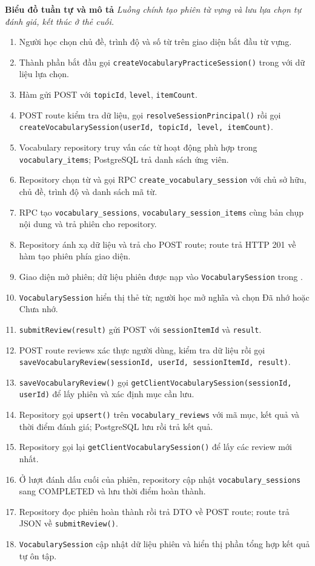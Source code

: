 \documentclass[12pt,a4paper,oneside]{report}
\begin{document}
\noindent\textbf{Biểu đồ tuần tự và mô tả}
\noindent\textit{Luồng chính tạo phiên từ vựng và lưu lựa chọn tự đánh giá, kết thúc ở thẻ cuối.}
\begin{enumerate}
    \item Người học chọn chủ đề, trình độ và số từ trên giao diện bắt đầu từ vựng.
    \item Thành phần bắt đầu gọi \texttt{createVocabularyPracticeSession()} trong  với dữ liệu lựa chọn.
    \item Hàm gửi POST  với \texttt{topicId}, \texttt{level}, \texttt{itemCount}.
    \item POST route kiểm tra dữ liệu, gọi \texttt{resolveSessionPrincipal()} rồi gọi \texttt{createVocabularySession(userId, topicId, level, itemCount)}.
    \item Vocabulary repository truy vấn các từ hoạt động phù hợp trong \texttt{vocabulary\_items}; PostgreSQL trả danh sách ứng viên.
    \item Repository chọn từ và gọi RPC \texttt{create\_vocabulary\_session} với chủ sở hữu, chủ đề, trình độ và danh sách mã từ.
    \item RPC tạo \texttt{vocabulary\_sessions}, \texttt{vocabulary\_session\_items} cùng bản chụp nội dung và trả phiên cho repository.
    \item Repository ánh xạ dữ liệu và trả cho POST route; route trả HTTP 201 về hàm tạo phiên phía giao diện.
    \item Giao diện mở phiên; dữ liệu phiên được nạp vào \texttt{VocabularySession} trong .
    \item \texttt{VocabularySession} hiển thị thẻ từ; người học mở nghĩa và chọn Đã nhớ hoặc Chưa nhớ.
    \item \texttt{submitReview(result)} gửi POST  với \texttt{sessionItemId} và \texttt{result}.
    \item POST route reviews xác thực người dùng, kiểm tra dữ liệu rồi gọi \texttt{saveVocabularyReview(sessionId, userId, sessionItemId, result)}.
    \item \texttt{saveVocabularyReview()} gọi \texttt{getClientVocabularySession(sessionId, userId)} để lấy phiên và xác định mục cần lưu.
    \item Repository gọi \texttt{upsert()} trên \texttt{vocabulary\_reviews} với mã mục, kết quả và thời điểm đánh giá; PostgreSQL lưu rồi trả kết quả.
    \item Repository gọi lại \texttt{getClientVocabularySession()} để lấy các review mới nhất.
    \item Ở lượt đánh dấu cuối của phiên, repository cập nhật \texttt{vocabulary\_sessions} sang COMPLETED và lưu thời điểm hoàn thành.
    \item Repository đọc phiên hoàn thành rồi trả DTO về POST route; route trả JSON về \texttt{submitReview()}.
    \item \texttt{VocabularySession} cập nhật dữ liệu phiên và hiển thị phần tổng hợp kết quả tự ôn tập.
\end{enumerate}
\end{document}
